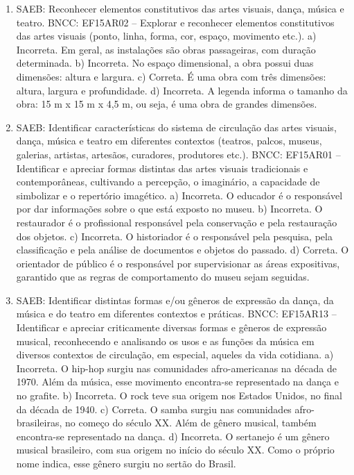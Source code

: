 \begin{enumerate}
\item
SAEB: Reconhecer elementos constitutivos das artes visuais, dança,
música e teatro. BNCC: EF15AR02 – Explorar e reconhecer elementos constitutivos das artes
visuais (ponto, linha, forma, cor, espaço, movimento etc.).
a) Incorreta. Em geral, as instalações são obras passageiras, com
duração determinada.
b) Incorreta. No espaço dimensional, a obra possui duas dimensões: altura
e largura.
c) Correta. É uma obra com três dimensões: altura, largura e
profundidade.
d) Incorreta. A legenda informa o tamanho da obra: 15 m x 15 m x 4,5 m, ou
seja, é uma obra de grandes dimensões.

\item
SAEB: Identificar características do sistema de circulação das artes
visuais, dança, música e teatro em diferentes contextos (teatros,
palcos, museus, galerias, artistas, artesãos, curadores, produtores
etc.). BNCC: EF15AR01 – Identificar e apreciar formas distintas das artes
visuais tradicionais e contemporâneas, cultivando a percepção, o
imaginário, a capacidade de simbolizar e o repertório imagético.
a)  Incorreta. O educador é o responsável por dar informações sobre o que
  está exposto no museu.
b) Incorreta. O restaurador é o profissional responsável pela conservação
  e pela restauração dos objetos.
c) Incorreta. O historiador é o responsável pela pesquisa, pela classificação
  e pela análise de documentos e objetos do passado.
d) Correta. O orientador de público é o responsável por supervisionar as
  áreas expositivas, garantido que as regras de comportamento do museu
  sejam seguidas.

\item
SAEB: Identificar distintas formas e/ou gêneros de expressão da dança,
da música e do teatro em diferentes contextos e práticas. BNCC: EF15AR13 – Identificar e apreciar criticamente diversas formas e
gêneros de expressão musical, reconhecendo e analisando os usos e as
funções da música em diversos contextos de circulação, em especial,
aqueles da vida cotidiana.
a)  Incorreta. O hip-hop surgiu nas comunidades afro-americanas na década
  de 1970. Além da música, esse movimento encontra-se representado na
  dança e no grafite.
b) Incorreta. O rock teve sua origem nos Estados Unidos, no final da
  década de 1940.
c) Correta. O samba surgiu nas comunidades afro-brasileiras, no começo do
  século XX. Além de gênero musical, também encontra-se representado na
  dança.
d) Incorreta. O sertanejo é um gênero musical brasileiro, com sua origem
  no início do século XX. Como o próprio nome indica, esse gênero surgiu
  no sertão do Brasil.
\end{enumerate}

